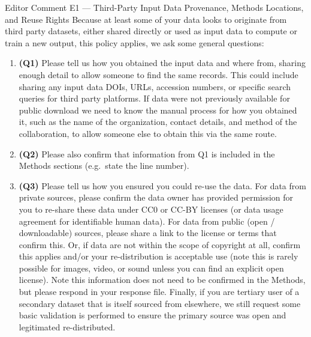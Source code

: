 \documentclass[11pt,letterpaper]{article}
\begin{document}
\begin{commentbox}[label={ed:e1}]{Editor Comment E1 --- Third-Party Input Data Provenance, Methods Locations, and Reuse Rights}
Because at least some of your data looks to originate from third party datasets, either shared directly or used as input data to compute or train a new output, this policy applies, we ask some general questions:

\begin{enumerate}[label=\arabic*), leftmargin=1.8em, topsep=4pt, itemsep=4pt]
  \item \textbf{(Q1)} Please tell us how you obtained the input data and where from, sharing enough detail to allow someone to find the same records. This could include sharing any input data DOIs, URLs, accession numbers, or specific search queries for third party platforms. If data were not previously available for public download we need to know the manual process for how you obtained it, such as the name of the organization, contact details, and method of the collaboration, to allow someone else to obtain this via the same route.
  \item \textbf{(Q2)} Please also confirm that information from Q1 is included in the Methods sections (e.g.\ state the line number).
  \item \textbf{(Q3)} Please tell us how you ensured you could re-use the data. For data from private sources, please confirm the data owner has provided permission for you to re-share these data under CC0 or CC-BY licenses (or data usage agreement for identifiable human data). For data from public (open / downloadable) sources, please share a link to the license or terms that confirm this. Or, if data are not within the scope of copyright at all, confirm this applies and/or your re-distribution is acceptable use (note this is rarely possible for images, video, or sound unless you can find an explicit open license). Note this information does not need to be confirmed in the Methods, but please respond in your response file. Finally, if you are tertiary user of a secondary dataset that is itself sourced from elsewhere, we still request some basic validation is performed to ensure the primary source was open and legitimated re-distributed.
\end{enumerate}
\end{commentbox}
\end{document}
